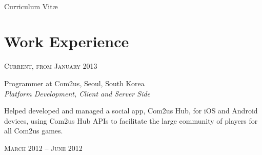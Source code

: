 \documentclass[10pt]{article} %
\begin{document}
\color{textcolor} %


\par{\\ %
{\color{headings} Curriculum {Vit\ae}\\[15pt]\par} %
	

\begin{minipage}[t]{0.5\textwidth} %
\vspace{0pt} %
	

\section{Work Experience} 


{\raggedleft\textsc{Current, from January 2013}\par}

{\raggedright\large Programmer at Com2us, Seoul, South Korea\\
\textit{Platform Development, Client and Server Side}\\[5pt]}

\normalsize{Helped developed and managed a social app, Com2us Hub, for iOS and Android devices, using Com2us Hub APIs to facilitate the large community of players for all Com2us games.}\\


{\raggedleft\textsc{March 2012 -- June 2012}\par}


\end{minipage}}
\end{document}
